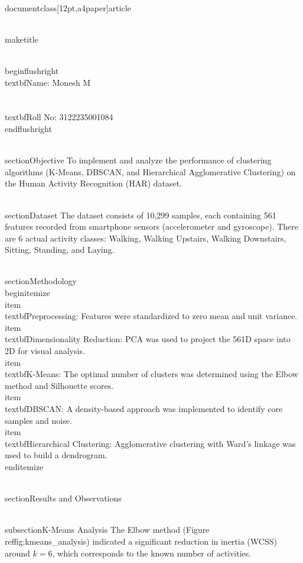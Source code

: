 \\documentclass[12pt,a4paper]{article}
\begin{document}
\\maketitle

\\begin{flushright}
  \\textbf{Name:} Monesh M \\\\
  \\textbf{Roll No:} 3122235001084
\\end{flushright}

\\section{Objective}
To implement and analyze the performance of clustering algorithms (K-Means, DBSCAN, and Hierarchical Agglomerative Clustering) on the Human Activity Recognition (HAR) dataset.

\\section{Dataset}
The dataset consists of 10,299 samples, each containing 561 features recorded from smartphone sensors (accelerometer and gyroscope). There are 6 actual activity classes: Walking, Walking Upstairs, Walking Downstairs, Sitting, Standing, and Laying.

\\section{Methodology}
\\begin{itemize}
    \\item \\textbf{Preprocessing:} Features were standardized to zero mean and unit variance.
    \\item \\textbf{Dimensionality Reduction:} PCA was used to project the 561D space into 2D for visual analysis.
    \\item \\textbf{K-Means:} The optimal number of clusters was determined using the Elbow method and Silhouette scores.
    \\item \\textbf{DBSCAN:} A density-based approach was implemented to identify core samples and noise.
    \\item \\textbf{Hierarchical Clustering:} Agglomerative clustering with Ward's linkage was used to build a dendrogram.
\\end{itemize}

\\section{Results and Observations}

\\subsection{K-Means Analysis}
The Elbow method (Figure \\ref{fig:kmeans_analysis}) indicated a significant reduction in inertia (WCSS) around $k=6$, which corresponds to the known number of activities.
\end{document}
